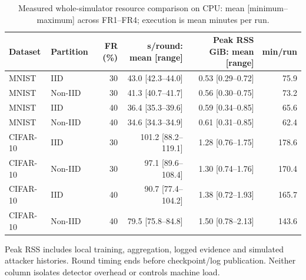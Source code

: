 \begin{table}[t]
\centering\footnotesize\setlength{\tabcolsep}{4pt}
\caption{Measured whole-simulator resource comparison on CPU: mean [minimum--maximum] across FR1--FR4; execution is mean minutes per run.}\label{tab:cost}
\begin{tabular}{llrrrr}
\toprule
Dataset & Partition & FR (\%) & s/round: mean [range] & Peak RSS GiB: mean [range] & min/run \\
\midrule
MNIST & IID & 30 & 43.0 [42.3--44.0] & 0.53 [0.29--0.72] & 75.9 \\
MNIST & Non-IID & 30 & 41.3 [40.7--41.7] & 0.56 [0.30--0.75] & 73.2 \\
MNIST & IID & 40 & 36.4 [35.3--39.6] & 0.59 [0.34--0.85] & 65.6 \\
MNIST & Non-IID & 40 & 34.6 [34.3--34.9] & 0.61 [0.31--0.85] & 62.4 \\
CIFAR-10 & IID & 30 & 101.2 [88.2--119.1] & 1.28 [0.76--1.75] & 178.6 \\
CIFAR-10 & Non-IID & 30 & 97.1 [89.6--108.4] & 1.30 [0.74--1.76] & 170.4 \\
CIFAR-10 & IID & 40 & 90.7 [77.4--104.2] & 1.38 [0.72--1.93] & 165.7 \\
CIFAR-10 & Non-IID & 40 & 79.5 [75.8--84.8] & 1.50 [0.78--2.13] & 143.6 \\
\bottomrule
\end{tabular}
\par\smallskip\begin{minipage}{0.96\textwidth}\scriptsize Peak RSS includes local training, aggregation, logged evidence and simulated attacker histories. Round timing ends before checkpoint/log publication. Neither column isolates detector overhead or controls machine load.\end{minipage}
\end{table}
